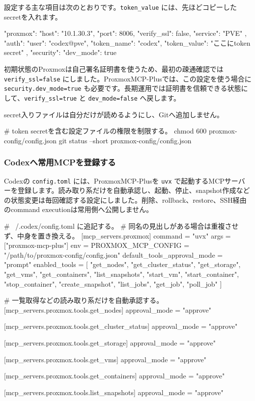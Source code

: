 設定する主な項目は次のとおりです。\texttt{token\_value} には、先ほどコピーしたsecretを入れます。

\begin{commands}
"proxmox": {
  "host": "10.1.30.3",
  "port": 8006,
  "verify_ssl": false,
  "service": "PVE"
},
"auth": {
  "user": "codex@pve",
  "token_name": "codex",
  "token_value": "ここにtoken secret"
},
"security": {
  "dev_mode": true
}
\end{commands}

初期状態のProxmoxは自己署名証明書を使うため、最初の疎通確認では \texttt{verify\_ssl=false} にしました。ProxmoxMCP-Plusでは、この設定を使う場合に \texttt{security.dev\_mode=true} も必要です。長期運用では証明書を信頼できる状態にして、\texttt{verify\_ssl=true} と \texttt{dev\_mode=false} へ戻します。

secret入りファイルは自分だけが読めるようにし、Gitへ追加しません。

\begin{commands}
# token secretを含む設定ファイルの権限を制限する。
chmod 600 proxmox-config/config.json
git status --short proxmox-config/config.json
\end{commands}

\subsubsection*{Codexへ常用MCPを登録する}

Codexの \texttt{config.toml} には、ProxmoxMCP-Plusを \texttt{uvx} で起動するMCPサーバーを登録します。読み取り系だけを自動承認し、起動、停止、snapshot作成などの状態変更は毎回確認する設定にしました。削除、rollback、restore、SSH経由のcommand executionは常用側へ公開しません。

\begin{commands}
# ~/.codex/config.toml に追記する。
# 同名の見出しがある場合は重複させず、中身を置き換える。
[mcp_servers.proxmox]
command = "uvx"
args = ["proxmox-mcp-plus"]
env = { PROXMOX_MCP_CONFIG = "/path/to/proxmox-config/config.json" }
default_tools_approval_mode = "prompt"
enabled_tools = [
  "get_nodes",
  "get_cluster_status",
  "get_storage",
  "get_vms",
  "get_containers",
  "list_snapshots",
  "start_vm",
  "start_container",
  "stop_container",
  "create_snapshot",
  "list_jobs",
  "get_job",
  "poll_job"
]

# 一覧取得などの読み取り系だけを自動承認する。
[mcp_servers.proxmox.tools.get_nodes]
approval_mode = "approve"

[mcp_servers.proxmox.tools.get_cluster_status]
approval_mode = "approve"

[mcp_servers.proxmox.tools.get_storage]
approval_mode = "approve"

[mcp_servers.proxmox.tools.get_vms]
approval_mode = "approve"

[mcp_servers.proxmox.tools.get_containers]
approval_mode = "approve"

[mcp_servers.proxmox.tools.list_snapshots]
approval_mode = "approve"
\end{commands}

